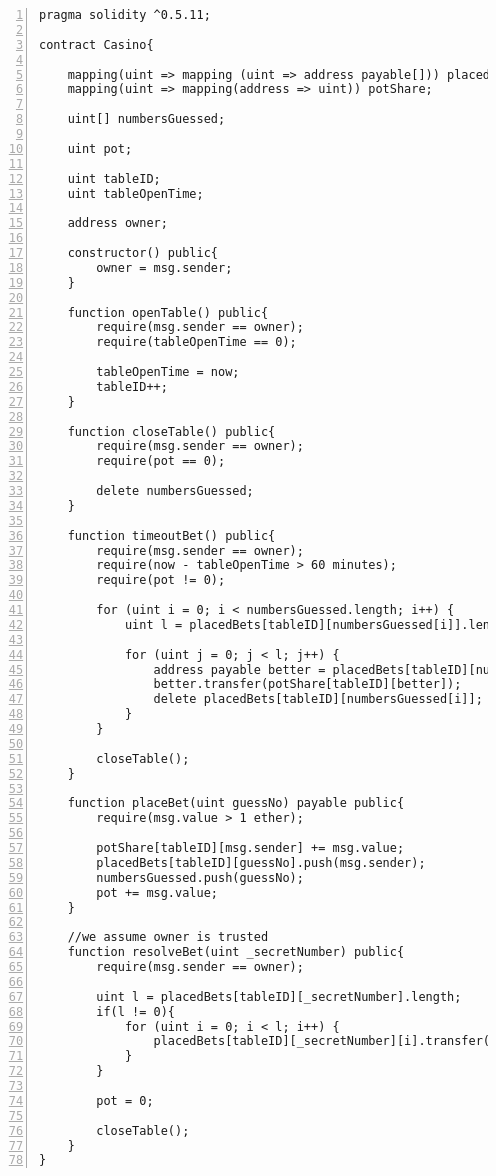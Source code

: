 \documentclass{article}
\begin{document}
  \small\begin{lstlisting}[language=DEA,basicstyle=\scriptsize,numbers=left,numbersep=2pt,xleftmargin=0.3cm,escapechar=\%,label={code:casino},caption={Casino smart contract.}]
pragma solidity ^0.5.11;

contract Casino{

    mapping(uint => mapping (uint => address payable[])) placedBets;
    mapping(uint => mapping(address => uint)) potShare;

    uint[] numbersGuessed;
    
    uint pot;

    uint tableID;
    uint tableOpenTime;

    address owner;

    constructor() public{
        owner = msg.sender;
    }

    function openTable() public{
        require(msg.sender == owner);
        require(tableOpenTime == 0);

        tableOpenTime = now;
        tableID++;
    }

    function closeTable() public{
        require(msg.sender == owner);
        require(pot == 0);

        delete numbersGuessed;
    }

    function timeoutBet() public{
        require(msg.sender == owner);
        require(now - tableOpenTime > 60 minutes);
        require(pot != 0);
        
        for (uint i = 0; i < numbersGuessed.length; i++) {
            uint l = placedBets[tableID][numbersGuessed[i]].length;

            for (uint j = 0; j < l; j++) {
                address payable better = placedBets[tableID][numbersGuessed[i]][l];
                better.transfer(potShare[tableID][better]);
                delete placedBets[tableID][numbersGuessed[i]];
            }
        }

        closeTable();
    }

    function placeBet(uint guessNo) payable public{
        require(msg.value > 1 ether);

        potShare[tableID][msg.sender] += msg.value;
        placedBets[tableID][guessNo].push(msg.sender);
        numbersGuessed.push(guessNo);
        pot += msg.value;
    }

    //we assume owner is trusted
    function resolveBet(uint _secretNumber) public{
        require(msg.sender == owner);

        uint l = placedBets[tableID][_secretNumber].length;
        if(l != 0){
            for (uint i = 0; i < l; i++) {
                placedBets[tableID][_secretNumber][i].transfer(pot/l);
            }
        }

        pot = 0;

        closeTable();
    }
}
      \end{lstlisting}\normalsize
      
\end{document}

